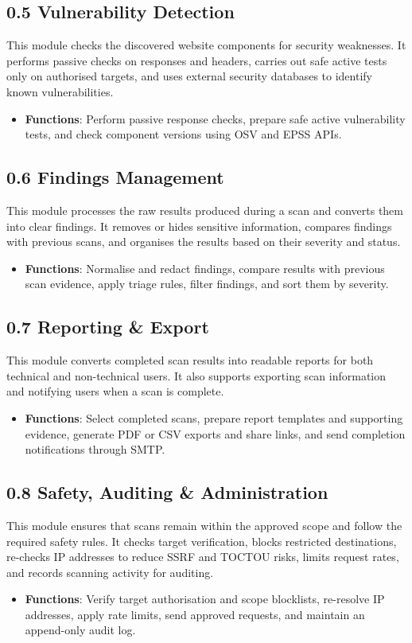 \documentclass[11pt,a4paper]{article}
\begin{document}
\subsection{0.5 Vulnerability Detection}
This module checks the discovered website components for security weaknesses. It performs passive checks on responses and headers, carries out safe active tests only on authorised targets, and uses external security databases to identify known vulnerabilities.
\begin{itemize}[noitemsep]
    \item \textbf{Functions}: Perform passive response checks, prepare safe active vulnerability tests, and check component versions using OSV and EPSS APIs.
\end{itemize}

\subsection{0.6 Findings Management}
This module processes the raw results produced during a scan and converts them into clear findings. It removes or hides sensitive information, compares findings with previous scans, and organises the results based on their severity and status.
\begin{itemize}[noitemsep]
    \item \textbf{Functions}: Normalise and redact findings, compare results with previous scan evidence, apply triage rules, filter findings, and sort them by severity.
\end{itemize}

\subsection{0.7 Reporting \& Export}
This module converts completed scan results into readable reports for both technical and non-technical users. It also supports exporting scan information and notifying users when a scan is complete.
\begin{itemize}[noitemsep]
    \item \textbf{Functions}: Select completed scans, prepare report templates and supporting evidence, generate PDF or CSV exports and share links, and send completion notifications through SMTP.
\end{itemize}

\subsection{0.8 Safety, Auditing \& Administration}
This module ensures that scans remain within the approved scope and follow the required safety rules. It checks target verification, blocks restricted destinations, re-checks IP addresses to reduce SSRF and TOCTOU risks, limits request rates, and records scanning activity for auditing.
\begin{itemize}[noitemsep]
    \item \textbf{Functions}: Verify target authorisation and scope blocklists, re-resolve IP addresses, apply rate limits, send approved requests, and maintain an append-only audit log.
\end{itemize}
\end{document}
